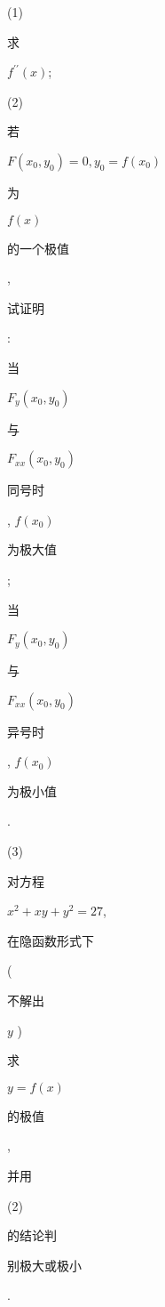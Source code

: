\documentclass[10pt]{article}
\begin{document}
(1) \begin{CJK}{UTF8}{mj}求\end{CJK} $f^{\prime \prime}(x)$;

(2) \begin{CJK}{UTF8}{mj}若\end{CJK} $F\left(x_{0}, y_{0}\right)=0, y_{0}=f\left(x_{0}\right)$ \begin{CJK}{UTF8}{mj}为\end{CJK} $f(x)$ \begin{CJK}{UTF8}{mj}的一个极值\end{CJK}, \begin{CJK}{UTF8}{mj}试证明\end{CJK}:

\begin{CJK}{UTF8}{mj}当\end{CJK} $F_{y}\left(x_{0}, y_{0}\right)$ \begin{CJK}{UTF8}{mj}与\end{CJK} $F_{x x}\left(x_{0}, y_{0}\right)$ \begin{CJK}{UTF8}{mj}同号时\end{CJK}, $f\left(x_{0}\right)$ \begin{CJK}{UTF8}{mj}为极大值\end{CJK};

\begin{CJK}{UTF8}{mj}当\end{CJK} $F_{y}\left(x_{0}, y_{0}\right)$ \begin{CJK}{UTF8}{mj}与\end{CJK} $F_{x x}\left(x_{0}, y_{0}\right)$ \begin{CJK}{UTF8}{mj}异号时\end{CJK}, $f\left(x_{0}\right)$ \begin{CJK}{UTF8}{mj}为极小值\end{CJK}.

(3) \begin{CJK}{UTF8}{mj}对方程\end{CJK} $x^{2}+x y+y^{2}=27$, \begin{CJK}{UTF8}{mj}在隐函数形式下\end{CJK} (\begin{CJK}{UTF8}{mj}不解出\end{CJK} $y$ ) \begin{CJK}{UTF8}{mj}求\end{CJK} $y=f(x)$ \begin{CJK}{UTF8}{mj}的极值\end{CJK}, \begin{CJK}{UTF8}{mj}并用\end{CJK} (2) \begin{CJK}{UTF8}{mj}的结论判\end{CJK} \begin{CJK}{UTF8}{mj}别极大或极小\end{CJK}.
\end{document}
